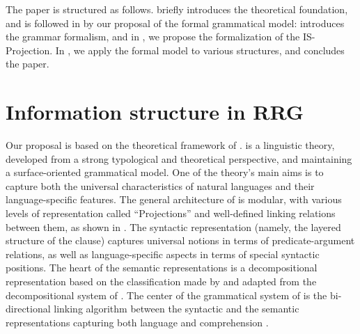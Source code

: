 \documentclass[output=paper,colorlinks,citecolor=brown]{langscibook}
\begin{document}
The paper is structured as follows.  briefly introduces the theoretical foundation, and is followed in  by our proposal of the formal grammatical model:  introduces the grammar formalism, and in , we propose the formalization of the IS-Projection. In , we apply the formal model to various  structures, and  concludes the paper. 

\section{Information structure in RRG}\label{sec:is.rrg:Balogh}

Our proposal is based on the theoretical framework of  \citep[;][]{vvlp:97,vanvalin:05,vanvalin:23:princ}.  is a linguistic theory, developed from a strong typological and theoretical perspective, and maintaining a surface-oriented grammatical model. One of the theory's main aims is to capture both the universal characteristics of natural languages and their language-specific features. The general architecture of  is modular, with various levels of representation called ``Projections'' and well-defined linking relations between them, as shown in . The syntactic representation (namely, the layered structure of the clause) captures universal notions in terms of predicate-argument relations, as well as language-specific aspects in terms of special syntactic positions. The heart of the semantic representations is a decompositional representation based on the classification made by \citet{vendler:67} and adapted from the decompositional system of \citet{dowty:79}. The center of the grammatical system of  is the bi-directional linking algorithm between the syntactic and the semantic representations capturing both language  and comprehension \citep[][]{vanvalin:23:langproc}.
\end{document}
